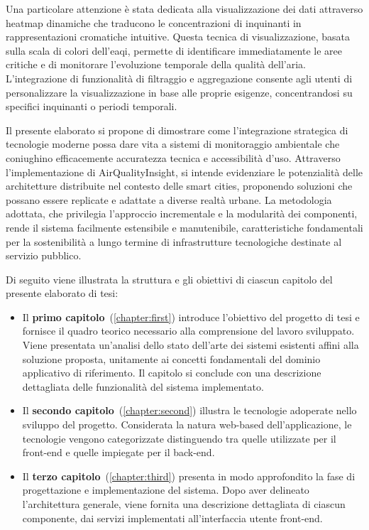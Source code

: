 Una particolare attenzione è stata dedicata alla visualizzazione dei dati attraverso heatmap dinamiche che traducono
le concentrazioni di inquinanti in rappresentazioni cromatiche intuitive. Questa tecnica di visualizzazione,
basata sulla scala di colori dell'\acrfull{eaqi}, permette di identificare immediatamente le aree critiche e di
monitorare l'evoluzione temporale della qualità dell'aria. L'integrazione di funzionalità di filtraggio e aggregazione
consente agli utenti di personalizzare la visualizzazione in base alle proprie esigenze, concentrandosi
su specifici inquinanti o periodi temporali.

Il presente elaborato si propone di dimostrare come l'integrazione strategica di tecnologie moderne possa dare vita
a sistemi di monitoraggio ambientale che coniughino efficacemente accuratezza tecnica e accessibilità d'uso.
Attraverso l'implementazione di AirQualityInsight, si intende evidenziare le potenzialità delle architetture
distribuite nel contesto delle smart cities, proponendo soluzioni che possano essere replicate e adattate a diverse
realtà urbane. La metodologia adottata, che privilegia l'approccio incrementale e la modularità dei componenti,
rende il sistema facilmente estensibile e manutenibile, caratteristiche fondamentali per la sostenibilità
a lungo termine di infrastrutture tecnologiche destinate al servizio pubblico.

Di seguito viene illustrata la struttura e gli obiettivi di ciascun capitolo del presente elaborato di tesi:

\begin{itemize}
  \item Il \textbf{primo capitolo}~(\ref{chapter:first}) introduce l'obiettivo del progetto di tesi e fornisce
  il quadro teorico necessario alla comprensione del lavoro sviluppato. Viene presentata un'analisi
  dello stato dell'arte dei sistemi esistenti affini alla soluzione proposta, unitamente ai concetti fondamentali
  del dominio applicativo di riferimento. Il capitolo si conclude con una descrizione dettagliata delle funzionalità
  del sistema implementato.
  \item Il \textbf{secondo capitolo}~(\ref{chapter:second}) illustra le tecnologie adoperate
  nello sviluppo del progetto. Considerata la natura web-based dell'applicazione, le tecnologie vengono categorizzate
  distinguendo tra quelle utilizzate per il front-end e quelle impiegate per il back-end.
  \item Il \textbf{terzo capitolo}~(\ref{chapter:third}) presenta in modo approfondito la fase
  di progettazione e implementazione del sistema. Dopo aver delineato l'architettura generale, viene fornita
  una descrizione dettagliata di ciascun componente, dai servizi implementati all'interfaccia utente front-end.
\end{itemize}

\donotmumberlastpageonleft